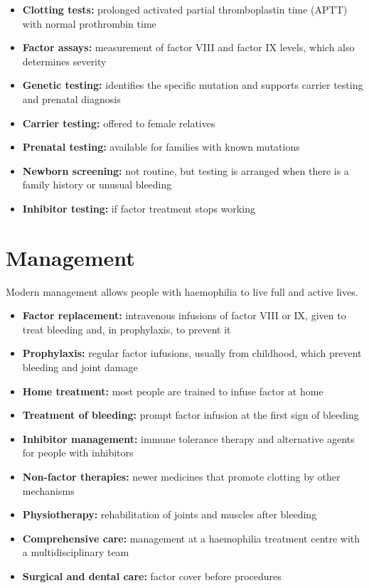 \begin{itemize}
    \item \textbf{Clotting tests:} prolonged activated partial thromboplastin time (APTT) with normal prothrombin time
    \item \textbf{Factor assays:} measurement of factor VIII and factor IX levels, which also determines severity
    \item \textbf{Genetic testing:} identifies the specific mutation and supports carrier testing and prenatal diagnosis
    \item \textbf{Carrier testing:} offered to female relatives
    \item \textbf{Prenatal testing:} available for families with known mutations
    \item \textbf{Newborn screening:} not routine, but testing is arranged when there is a family history or unusual bleeding
    \item \textbf{Inhibitor testing:} if factor treatment stops working
\end{itemize}

\section*{Management}
Modern management allows people with haemophilia to live full and active lives.

\begin{itemize}
    \item \textbf{Factor replacement:} intravenous infusions of factor VIII or IX, given to treat bleeding and, in prophylaxis, to prevent it
    \item \textbf{Prophylaxis:} regular factor infusions, usually from childhood, which prevent bleeding and joint damage
    \item \textbf{Home treatment:} most people are trained to infuse factor at home
    \item \textbf{Treatment of bleeding:} prompt factor infusion at the first sign of bleeding
    \item \textbf{Inhibitor management:} immune tolerance therapy and alternative agents for people with inhibitors
    \item \textbf{Non-factor therapies:} newer medicines that promote clotting by other mechanisms
    \item \textbf{Physiotherapy:} rehabilitation of joints and muscles after bleeding
    \item \textbf{Comprehensive care:} management at a haemophilia treatment centre with a multidisciplinary team
    \item \textbf{Surgical and dental care:} factor cover before procedures
\end{itemize}

